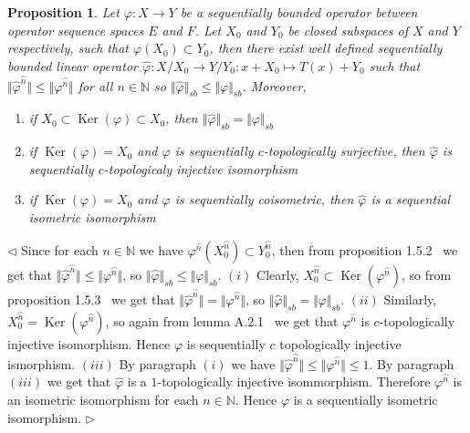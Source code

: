\documentclass[12pt]{article}
\newtheorem{proposition}[theorem]{Proposition}
\newenvironment{proof}{\par $\triangleleft$}{$\triangleright$}
\begin{document}
\begin{proposition}\label{PrFactorSQOp} 
Let $\varphi:X\to Y$ be a sequentially bounded operator between operator 
sequence spaces $E$ and $F$. Let $X_0$ and $Y_0$ be closed subspaces of $X$ and 
$Y$ respectively, such that $\varphi(X_0)\subset Y_0$, then there exist well 
defined sequentially bounded linear operator 
$\widehat{\varphi}:X/X_0\to Y/Y_0:x+X_0\mapsto T(x)+Y_0$ such that 
$\Vert\widehat{\varphi}^{\wideparen{n}}\Vert
\leq\Vert \varphi^{\wideparen{n}}\Vert$ for all $n\in\mathbb{N}$ so 
$\Vert\widehat{\varphi}\Vert_{sb}\leq\Vert \varphi\Vert_{sb}$. Moreover,
\begin{enumerate}
    \item if $X_0\subset \operatorname{Ker}(\varphi)\subset X_0$, then 
    $\Vert\widehat{\varphi}\Vert_{sb}=\Vert \varphi\Vert_{sb}$

    \item if $\operatorname{Ker}(\varphi)= X_0$ and $\varphi$ is sequentially 
    $c$-topologically surjective, then $\widehat{\varphi}$ is sequentially 
    $c$-topologicaly injective isomorphism

    \item if $\operatorname{Ker}(\varphi)= X_0$ and $\varphi$ is sequentially 
    coisometric, then $\widehat{\varphi}$ is a sequential isometric isomorphism
\end{enumerate}
\end{proposition}
\begin{proof}
Since for each $n\in\mathbb{N}$ we have 
$\varphi^{\widehat{n}}(X_0^{\wideparen{n}})\subset Y_0^{\wideparen{n}}$, then 
from proposition 1.5.2~\cite{HelFA} we get that 
$\Vert\widehat{\varphi}^{\wideparen{n}}\Vert
\leq\Vert \varphi^{\wideparen{n}}\Vert$, so 
$\Vert\wideparen{\varphi}\Vert_{sb}\leq\Vert\varphi\Vert_{sb}$. $(i)$ Clearly, 
$X_0^{\wideparen{n}}\subset\operatorname{Ker}(\varphi^{\wideparen{n}})$, so from 
proposition 1.5.3~\cite{HelFA} we get that 
$\Vert\widehat{\varphi}^{\wideparen{n}}\Vert
=\Vert \varphi^{\wideparen{n}}\Vert$, so 
$\Vert\wideparen{\varphi}\Vert_{sb}=\Vert\varphi\Vert_{sb}$. 
$(ii)$ Similarly, 
$X_0^{\wideparen{n}}=\operatorname{Ker}(\varphi^{\wideparen{n}})$, 
so again from lemma A.2.1~\cite{EROpSp} we get that $\varphi^{\wideparen{n}}$ is 
$c$-topologically injective isomorphism. Hence $\varphi$ is sequentially $c$ 
topologically injective ismorphism. $(iii)$ By paragraph $(i)$ we have 
$\Vert\widehat{\varphi}^{\wideparen{n}}\Vert
\leq\Vert \varphi^{\wideparen{n}}\Vert\leq 1$. By paragraph $(iii)$ we get that 
$\widehat{\varphi}$ is a $1$-topologically injective isommorphism. Therefore 
$\varphi^{\wideparen{n}}$ is an isometric isomorphism for each $n\in\mathbb{N}$. 
Hence $\varphi$ is a sequentially isometric isomorphism.
\end{proof}
\end{document}
